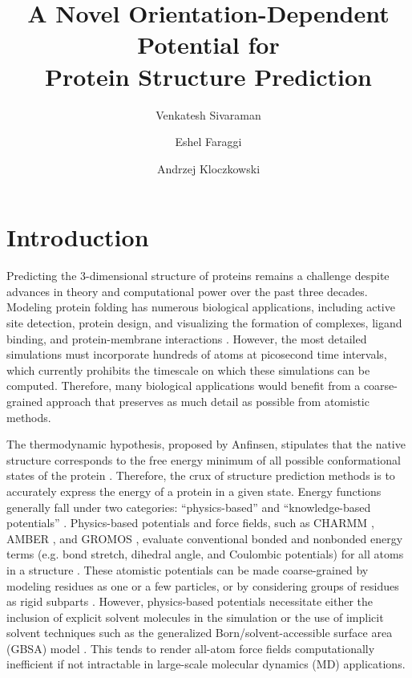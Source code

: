 \documentclass[11pt]{article}
\title{A Novel Orientation-Dependent Potential for \\Protein Structure Prediction}
\author[1]{Venkatesh Sivaraman}
\author[2,3]{Eshel Faraggi}
\author[3]{Andrzej Kloczkowski}
\affil[1]{Bexley High School}
\affil[2]{IUPUI}
\affil[3]{The Ohio State University}
\begin{document}
\maketitle

\raggedbottom

\begin{abstract}
\end{abstract}

\section{Introduction}
Predicting the 3-dimensional structure of proteins remains a challenge despite advances in theory and computational power over the past three decades.
Modeling protein folding has numerous biological applications, including active site detection, protein design, and visualizing the formation of complexes, ligand binding, and protein-membrane interactions \cite{baker2,kouza,monticelli}.
However, the most detailed simulations must incorporate hundreds of atoms at picosecond time intervals, which currently prohibits the timescale on which these simulations can be computed.
Therefore, many biological applications would benefit from a coarse-grained approach that preserves as much detail as possible from atomistic methods.

The thermodynamic hypothesis, proposed by Anfinsen, stipulates that the native structure corresponds to the free energy minimum of all possible conformational states of the protein \cite{anfinsen}.
Therefore, the crux of structure prediction methods is to accurately express the energy of a protein in a given state. 
Energy functions generally fall under two categories: ``physics-based'' and ``knowledge-based potentials'' \cite{lu}.
Physics-based potentials and force fields, such as CHARMM \cite{brooks}, AMBER \cite{amber}, and GROMOS \cite{gromos}, evaluate conventional bonded and nonbonded energy terms (e.g. bond stretch, dihedral angle, and Coulombic potentials) for all atoms in a structure \cite{brooks2}.
These atomistic potentials can be made coarse-grained by modeling residues as one or a few particles, or by considering groups of residues as rigid subparts \cite{basdevant,potestio,enciso,monticelli}.
However, physics-based potentials necessitate either the inclusion of explicit solvent molecules in the simulation \cite{onufriev} or the use of implicit solvent techniques such as the generalized Born/solvent-accessible surface area (GBSA) model \cite{feig,roux}.
This tends to render all-atom force fields computationally inefficient if not intractable in large-scale molecular dynamics (MD) applications.
\end{document}
